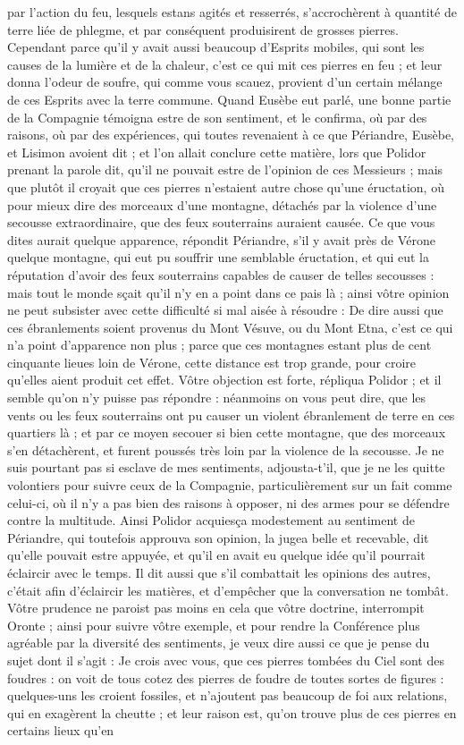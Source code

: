 \documentclass[a4paper, 11pt, oneside, polutonikogreek, french, landscape, twocolumn]{article}
\begin{document}
par l'action du feu, lesquels estans agités et resserrés, s'accrochèrent à quantité de terre liée de phlegme, et par conséquent produisirent de grosses pierres. Cependant parce qu'il y avait aussi beaucoup d'Esprits mobiles, qui sont les causes de la lumière et de la chaleur, c'est ce qui mit ces pierres en feu ; et leur donna l'odeur de soufre, qui comme vous scauez, provient d'un certain mélange de ces Esprits avec la terre commune. Quand Eusèbe eut parlé, une bonne partie de la Compagnie témoigna estre de son sentiment, et le confirma, où par des raisons, où par des expériences, qui toutes revenaient à ce que Périandre, Eusèbe, et Lisimon avoient dit ; et l'on allait conclure cette matière, lors que Polidor prenant la parole dit, qu'il ne pouvait estre de l'opinion de ces Messieurs ; mais que plutôt il croyait que ces pierres n'estaient autre chose qu'une éructation, où pour mieux dire des morceaux d'une montagne, détachés par la violence d'une secousse extraordinaire, que des feux souterrains auraient causée. Ce que vous dites aurait quelque apparence, répondit Périandre, s'il y avait près de Vérone quelque montagne, qui eut pu souffrir une semblable éructation, et qui eut la réputation d'avoir des feux souterrains capables de causer de telles secousses : mais tout le monde sçait qu'il n'y en a point dans ce pais là ; ainsi vôtre opinion ne peut subsister avec cette difficulté si mal aisée à résoudre : De dire aussi que ces ébranlements soient provenus du Mont Vésuve, ou du Mont Etna, c'est ce qui n'a point d'apparence non plus ; parce que ces montagnes estant plus de cent cinquante lieues loin de Vérone, cette distance est trop grande, pour croire qu'elles aient produit cet effet. Vôtre objection est forte, répliqua Polidor ; et il semble qu'on n'y puisse pas répondre : néanmoins on vous peut dire, que les vents ou les feux souterrains ont pu causer un violent ébranlement de terre en ces quartiers là ; et par ce moyen secouer si bien cette montagne, que des morceaux s'en détachèrent, et furent poussés très loin par la violence de la secousse. Je ne suis pourtant pas si esclave de mes sentiments, adjousta-t'il, que je ne les quitte volontiers pour suivre ceux de la Compagnie, particulièrement sur un fait comme celui-ci, où il n'y a pas bien des raisons à opposer, ni des armes pour se défendre contre la multitude. Ainsi Polidor acquiesça modestement au sentiment de Périandre, qui toutefois approuva son opinion, la jugea belle et recevable, dit qu'elle pouvait estre appuyée, et qu'il en avait eu quelque idée qu'il pourrait éclaircir avec le temps. Il dit aussi que s'il combattait les opinions des autres, c'était afin d'éclaircir les matières, et d'empêcher que la conversation ne tombât. Vôtre prudence ne paroist pas moins en cela que vôtre doctrine, interrompit Oronte ; ainsi pour suivre vôtre exemple, et pour rendre la Conférence plus agréable par la diversité des sentiments, je veux dire aussi ce que je pense du sujet dont il s'agit : Je crois avec vous, que ces pierres tombées du Ciel sont des foudres : on voit de tous cotez des pierres de foudre de toutes sortes de figures : quelques-uns les croient fossiles, et n'ajoutent pas beaucoup de foi aux relations, qui en exagèrent la cheutte ; et leur raison est, qu'on trouve plus de ces pierres en certains lieux qu'en 
\end{document}

